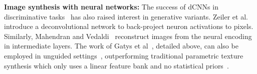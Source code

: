 \documentclass[10pt,twocolumn,letterpaper]{article}
\begin{document}
\textbf{Image synthesis with neural networks:} 
The success of dCNNs in discriminative tasks~\cite{ILSVRC15} has also raised interest in generative variants. Zeiler et al.~\cite{Zeiler14} introduce a deconvolutional network to back-project neuron activations to pixels. Similarly, Mahendran and  Vedaldi~\cite{Mahendran15} reconstruct images from the neural encoding in intermediate layers. The work of Gatys et al~\cite{Gatys15}, detailed above, can also be employed in unguided settings~\cite{Gatys2015b}, outperforming traditional parametric texture synthesis which only uses a linear feature bank and no statistical priors~\cite{Portilla00}. %
%
%
%
%
\end{document}
